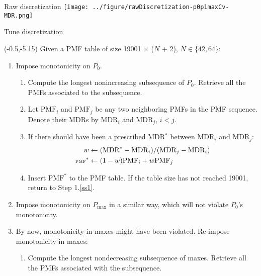 \documentclass[aspectratio=169]{beamer}
\begin{document}
\begin{frame}{Raw discretization}
\centering
\texttt{[image: ../figure/rawDiscretization-p0p1maxCv-MDR.png]}
\end{frame}


\begin{frame}{Tune discretization}

\begin{textblock}{7.75}(-0.5,-5.15)
\tiny Given a PMF table of size 19001 $\times$ ($N$ + 2), $N\in\{42, 64\}$:\smallskip

\begin{enumerate}
\tiny\item Impose monotonicity on $P_0$.\medskip

\begin{enumerate}

\tiny\item Compute the longest nonincreasing subsequence of $P_0$. Retrieve all the PMFs associated to the subsequence.\medskip

\tiny\item \label{ss1} Let $\text{PMF}_i$ and $\text{PMF}_j$ be any two neighboring PMFs in the PMF sequence. Denote their MDRs by $\text{MDR}_i$ and $\text{MDR}_j$, $i<j$.\medskip

\tiny\item If there should have been a prescribed MDR$^*$ between $\text{MDR}_i$ and $\text{MDR}_j$:
\begin{equation*}
\begin{split}
\tiny w&\gets (\text{MDR}^* - \text{MDR}_i) / (\text{MDR}_j - \text{MDR}_i)\\
\tiny \text{PMF}^*&\gets (1-w)\text{PMF}_i + w \text{PMF}_j
\end{split}
\end{equation*}
\tiny\item Insert $\text{PMF}^*$ to the PMF table. If the table size has not reached 19001, return to Step 1.\ref{ss1}.\medskip

\end{enumerate}

\tiny\item Impose monotonicity on $P_{\max}$ in a similar way, which will not violate $P_0$'s monotonicity.\medskip

\tiny\item By now, monotonicity in maxes might have been violated. Re-impose monotonicity in maxes:\medskip

\begin{enumerate}
\tiny\item Compute the longest nondecreasing subsequence of maxes. Retrieve all the PMFs associated with the subsequence.\medskip




\end{enumerate}
\end{enumerate}
\end{textblock}
\end{frame}
\end{document}
